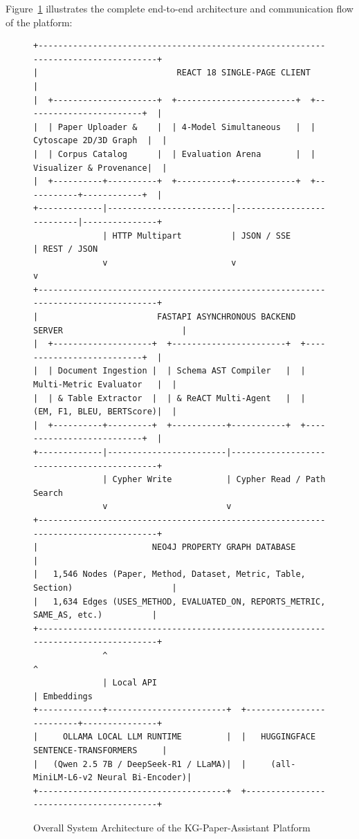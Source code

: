 \documentclass[12pt,a4paper,oneside]{report}
\begin{document}
Figure~\ref{fig:overall_arch} illustrates the complete end-to-end architecture and communication flow of the platform:
\begin{figure}[h]
\centering
\begin{verbatim}
+-----------------------------------------------------------------------------------+
|                            REACT 18 SINGLE-PAGE CLIENT                            |
|  +---------------------+  +------------------------+  +------------------------+  |
|  | Paper Uploader &    |  | 4-Model Simultaneous   |  | Cytoscape 2D/3D Graph  |  |
|  | Corpus Catalog      |  | Evaluation Arena       |  | Visualizer & Provenance|  |
|  +----------+----------+  +-----------+------------+  +-----------+------------+  |
+-------------|-------------------------|---------------------------|---------------+
              | HTTP Multipart          | JSON / SSE                | REST / JSON
              v                         v                           v
+-----------------------------------------------------------------------------------+
|                        FASTAPI ASYNCHRONOUS BACKEND SERVER                        |
|  +--------------------+  +-----------------------+  +--------------------------+  |
|  | Document Ingestion |  | Schema AST Compiler   |  | Multi-Metric Evaluator   |  |
|  | & Table Extractor  |  | & ReACT Multi-Agent   |  | (EM, F1, BLEU, BERTScore)|  |
|  +----------+---------+  +-----------+-----------+  +--------------------------+  |
+-------------|------------------------|--------------------------------------------+
              | Cypher Write           | Cypher Read / Path Search
              v                        v
+-----------------------------------------------------------------------------------+
|                       NEO4J PROPERTY GRAPH DATABASE                               |
|   1,546 Nodes (Paper, Method, Dataset, Metric, Table, Section)                    |
|   1,634 Edges (USES_METHOD, EVALUATED_ON, REPORTS_METRIC, SAME_AS, etc.)          |
+-----------------------------------------------------------------------------------+
              ^                                                     ^
              | Local API                                           | Embeddings
+-------------+------------------------+  +-------------------------+---------------+
|     OLLAMA LOCAL LLM RUNTIME         |  |   HUGGINGFACE SENTENCE-TRANSFORMERS     |
|   (Qwen 2.5 7B / DeepSeek-R1 / LLaMA)|  |     (all-MiniLM-L6-v2 Neural Bi-Encoder)|
+--------------------------------------+  +-----------------------------------------+
\end{verbatim}
\caption{Overall System Architecture of the KG-Paper-Assistant Platform}
\label{fig:overall_arch}
\end{figure}
\end{document}
